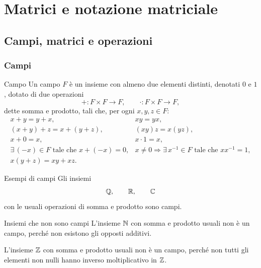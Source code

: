 \documentclass[a4paper]{article}
\begin{document}
\section{Matrici e notazione matriciale}

\subsection{Campi, matrici e operazioni}

\subsubsection{Campi}

\begin{snippetdefinition}{Campo}
    Un campo \(F\) è un insieme con almeno due elementi distinti, denotati \(0\) e \(1\), dotato di due operazioni
    \[
        + : F\times F\to F,
        \qquad
        \cdot : F\times F\to F,
    \]
    dette somma e prodotto, tali che, per ogni \(x,y,z\in F\):
    \[
        \begin{array}{ll}
            x+y=y+x, & xy=yx,\\
            (x+y)+z=x+(y+z), & (xy)z=x(yz),\\
            x+0=x, & x\cdot 1=x,\\
            \exists\,(-x)\in F \text{ tale che } x+(-x)=0, &
            x\neq 0 \Rightarrow \exists\,x^{-1}\in F \text{ tale che } xx^{-1}=1,\\
            x(y+z)=xy+xz. &
        \end{array}
    \]
\end{snippetdefinition}

\begin{snippetexample}{Esempi di campi}
    Gli insiemi
    \[
        \mathbb{Q},
        \qquad
        \mathbb{R},
        \qquad
        \mathbb{C}
    \]
    con le usuali operazioni di somma e prodotto sono campi.
\end{snippetexample}

\begin{snippetexample}{Insiemi che non sono campi}
    L'insieme \(\mathbb{N}\) con somma e prodotto usuali non è un campo, perché non esistono gli opposti additivi.

    L'insieme \(\mathbb{Z}\) con somma e prodotto usuali non è un campo, perché non tutti gli elementi non nulli hanno inverso moltiplicativo in \(\mathbb{Z}\).
\end{snippetexample}
\end{document}
